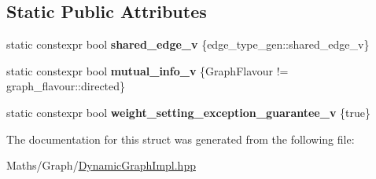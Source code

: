 \subsection*{Static Public Attributes}
\begin{DoxyCompactItemize}
\item 
\mbox{\label{structsequoia_1_1maths_1_1graph__impl_1_1dynamic__edge__traits_a43cbbf6de1452f8a679b16cd11f4b4c5}} 
static constexpr bool {\bfseries shared\+\_\+edge\+\_\+v} \{edge\+\_\+type\+\_\+gen\+::shared\+\_\+edge\+\_\+v\}
\item 
\mbox{\label{structsequoia_1_1maths_1_1graph__impl_1_1dynamic__edge__traits_ac750f9719537b8ada55a5b1ac87b9aa6}} 
static constexpr bool {\bfseries mutual\+\_\+info\+\_\+v} \{Graph\+Flavour != graph\+\_\+flavour\+::directed\}
\item 
\mbox{\label{structsequoia_1_1maths_1_1graph__impl_1_1dynamic__edge__traits_a2decbc31c8bbbd866f529854895f7df5}} 
static constexpr bool {\bfseries weight\+\_\+setting\+\_\+exception\+\_\+guarantee\+\_\+v} \{true\}
\end{DoxyCompactItemize}


The documentation for this struct was generated from the following file\+:\begin{DoxyCompactItemize}
\item 
Maths/\+Graph/\mbox{\hyperlink{_dynamic_graph_impl_8hpp}{Dynamic\+Graph\+Impl.\+hpp}}\end{DoxyCompactItemize}
